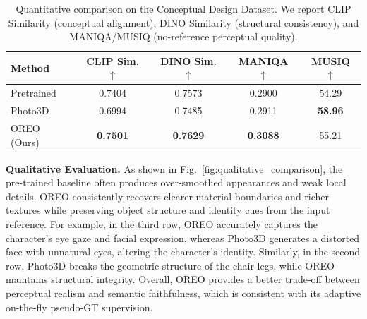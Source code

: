 \documentclass[runningheads]{llncs}
\begin{document}
\begin{table}[tb]
  \centering
  \caption{Quantitative comparison on the Conceptual Design Dataset. We report CLIP Similarity (conceptual alignment), DINO Similarity (structural consistency), and MANIQA/MUSIQ (no-reference perceptual quality).}
  \label{tab:main_results}
  \begin{tabular}{@{}lcccc@{}}
    \toprule
    Method & CLIP Sim. $\uparrow$ & DINO Sim. $\uparrow$ & MANIQA $\uparrow$ & MUSIQ $\uparrow$ \\
    \midrule
    Pretrained & 0.7404 & 0.7573 & 0.2900 & 54.29 \\
    Photo3D & 0.6994 & 0.7485 & 0.2911 & \textbf{58.96} \\
    OREO (Ours) & \textbf{0.7501} & \textbf{0.7629} & \textbf{0.3088} & 55.21 \\
    \bottomrule
  \end{tabular}
\end{table}



\textbf{Qualitative Evaluation.}
As shown in Fig.~\ref{fig:qualitative_comparison}, the pre-trained baseline often produces over-smoothed appearances and weak local details. OREO consistently recovers clearer material boundaries and richer textures while preserving object structure and identity cues from the input reference.
For example, in the third row, OREO accurately captures the character's eye gaze and facial expression, whereas Photo3D generates a distorted face with unnatural eyes, altering the character's identity.
Similarly, in the second row, Photo3D breaks the geometric structure of the chair legs, while OREO maintains structural integrity.
Overall, OREO provides a better trade-off between perceptual realism and semantic faithfulness, which is consistent with its adaptive on-the-fly pseudo-GT supervision.
\end{document}
